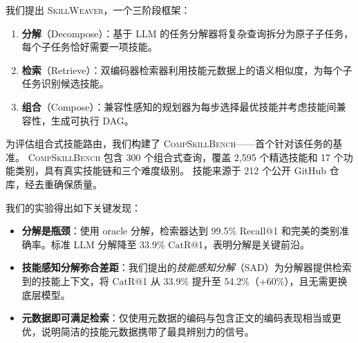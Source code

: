 \documentclass[11pt,a4paper]{ctexart}
\newcommand{\system}{\textsc{SkillWeaver}}
\newcommand{\benchmark}{\textsc{CompSkillBench}}
\newcommand{\catrecall}{\text{CatR}}
\begin{document}
我们提出 \system{}，一个三阶段框架：
\begin{enumerate}[nosep,leftmargin=*]
  \item \textbf{分解}（Decompose）：基于 LLM 的任务分解器将复杂查询拆分为原子子任务，每个子任务恰好需要一项技能。
  \item \textbf{检索}（Retrieve）：双编码器检索器利用技能元数据上的语义相似度，为每个子任务识别候选技能。
  \item \textbf{组合}（Compose）：兼容性感知的规划器为每步选择最优技能并考虑技能间兼容性，生成可执行 DAG。
\end{enumerate}

为评估组合式技能路由，我们构建了 \benchmark{}——首个针对该任务的基准。
\benchmark{} 包含 300 个组合式查询，覆盖 2{,}595 个精选技能和 17 个功能类别，具有真实技能链和三个难度级别。
技能来源于 212 个公开 GitHub 仓库，经去重确保质量。

我们的实验得出如下关键发现：
\begin{itemize}[nosep,leftmargin=*]
  \item \textbf{分解是瓶颈}：使用 oracle 分解，检索器达到 99.5\% Recall@1 和完美的类别准确率。标准 LLM 分解降至 33.9\% $\catrecall$@1，表明分解是关键前沿。
  \item \textbf{技能感知分解弥合差距}：我们提出的\emph{技能感知分解}（SAD）为分解器提供检索到的技能上下文，将 $\catrecall$@1 从 33.9\% 提升至 54.2\%（+60\%），且无需更换底层模型。
  \item \textbf{元数据即可满足检索}：仅使用元数据的编码与包含正文的编码表现相当或更优，说明简洁的技能元数据携带了最具辨别力的信号。
\end{itemize}
\end{document}

